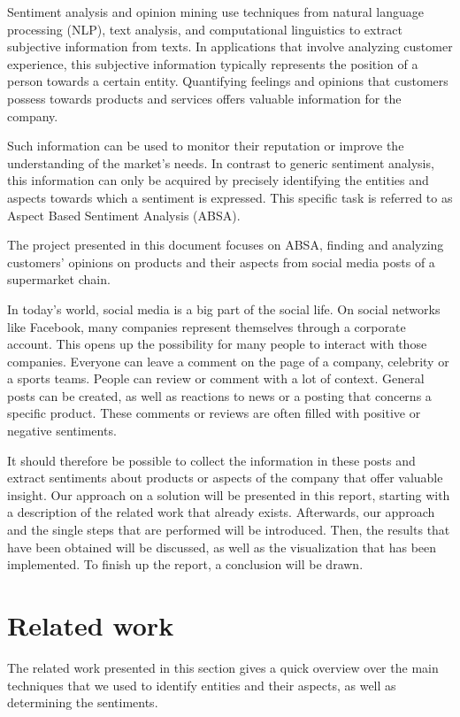 \documentclass[10pt,a4paper]{article}
\begin{document}
	Sentiment analysis and opinion mining use techniques from natural language processing (NLP), text analysis, and computational linguistics to extract subjective information from texts. In applications that involve analyzing customer experience, this subjective information typically represents the position of a person towards a certain entity. Quantifying feelings and opinions that customers possess towards products and services offers valuable information for the company. 
	
	Such information can be used to monitor their reputation or improve the understanding of the market's needs. In contrast to generic sentiment analysis, this information can only be acquired by precisely identifying the entities and aspects towards which a sentiment is expressed. This specific task is referred to as Aspect Based Sentiment Analysis (ABSA).
	
	The project presented in this document focuses on ABSA, finding and analyzing customers' opinions on products and their aspects from social media posts of a supermarket chain.
	
	 In today's world, social media is a big part of the social life. On social networks like Facebook, many companies represent themselves through a corporate account. This opens up the possibility for many people to interact with those companies. Everyone can leave a comment on the page of a company, celebrity or a sports teams. People can review or comment with a lot of context. General posts can be created, as well as reactions to news or a posting that concerns a specific product. These comments or reviews are often filled with positive or negative sentiments. 
	 
	 It should therefore be possible to collect the information in these posts and extract sentiments about products or aspects of the company that offer valuable insight. Our approach on a solution will be presented in this report, starting with a description of the related work that already exists. Afterwards, our approach and the single steps that are performed will be introduced. Then, the results that have been obtained will be discussed, as well as the visualization that has been implemented. To finish up the report, a conclusion will be drawn.
		
	\section{Related work}
	The related work presented in this section gives a quick overview over the main techniques that we used to identify entities and their aspects, as well as determining the sentiments.
		
\end{document}
